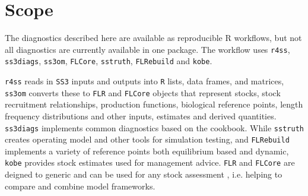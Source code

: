 \documentclass[11pt,a4paper]{article}
\begin{document}
\section{Scope}

The diagnostics described here are available as reproducible R workflows, but not all diagnostics are currently available in one package. The workflow uses \texttt{r4ss}, \texttt{ss3diags}, \texttt{ss3om}, \texttt{FLCore}, \texttt{sstruth}, \texttt{FLRebuild} and \texttt{kobe}.

\texttt{r4ss} reads in \texttt{SS3} inputs and outputs into \texttt{R} lists, data frames, and matrices, \texttt{ss3om} converts these to \texttt{FLR} and \texttt{FLCore} objects that represent stocks, stock recruitment relationships, production functions, biological reference points, length frequency distributions and other inputs, estimates and derived quantities. \texttt{ss3diags} implements common diagnostics based on the cookbook. While \texttt{sstruth} creates operating model and other tools for simulation testing, and \texttt{FLRebuild} implements a variety of reference points both equilibrium based and dynamic, \texttt{kobe} provides stock estimates used for management advice. \texttt{FLR} and \texttt{FLCore} are deigned to generic and can be used for any stock assessment \citep{kell2007flr}, i.e. helping to compare and combine model frameworks.
\end{document}
